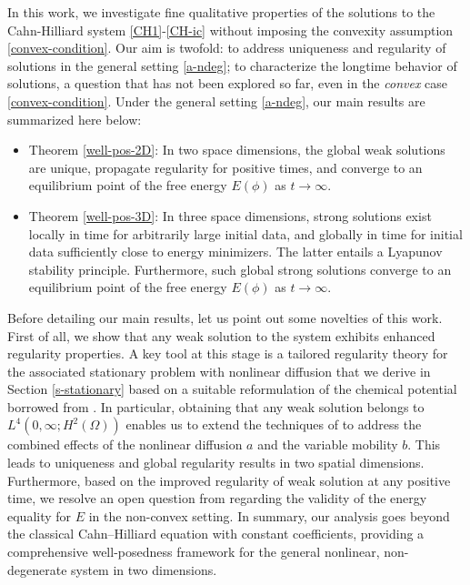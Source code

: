 \documentclass[11pt,reqno]{amsart}
\theoremstyle{remark}
\numberwithin{equation}{section}
\begin{document}
In this work, we investigate fine qualitative properties of the solutions to the Cahn-Hilliard system \eqref{CH1}-\eqref{CH-ic} without imposing the convexity assumption \eqref{convex-condition}. Our aim is twofold: to address uniqueness and regularity of solutions in the general setting  \eqref{a-ndeg}; to characterize the longtime behavior of solutions, a question that has not been explored so far, even in the \textit{convex} case \eqref{convex-condition}.
Under the general setting \eqref{a-ndeg}, our main results are summarized here below:
\begin{itemize}
\item Theorem \ref{well-pos-2D}:
In two space dimensions, the global weak solutions are unique, propagate regularity for positive times, and converge to an equilibrium point of the free energy $E(\phi)$ as $t\to \infty$.
\medskip

\item Theorem \ref{well-pos-3D}: In three space dimensions, strong solutions exist locally in time for arbitrarily large initial data, and globally in time for initial data sufficiently close to energy minimizers. The latter entails a Lyapunov stability principle. Furthermore, such global strong solutions converge to an equilibrium point of the free energy $E(\phi)$ as $t\to \infty$.
\end{itemize}

Before detailing our main results, let us point out some novelties of this work.
First of all, we show that any weak solution to the system exhibits enhanced regularity properties.
A key tool at this stage is a tailored regularity theory
for the associated stationary problem with nonlinear diffusion that we derive in Section \ref{s-stationary} based on a suitable reformulation of the
chemical potential borrowed from \cite{ADG2013}.
In particular, obtaining that any weak solution belongs to $L^4(0,\infty; H^2(\Omega))$ enables us to extend the techniques of \cite{CGGG2025}
to address the combined effects of the nonlinear diffusion $a$ and the variable mobility $b$.
This leads to uniqueness and global regularity results in two spatial dimensions.
Furthermore, based on the improved regularity of weak solution at any positive time, we resolve an open question from \cite[Remark 6.4]{SP2013} regarding the validity of the energy equality for $E$ in the non-convex setting. In summary, our analysis goes beyond the classical Cahn–Hilliard equation with constant coefficients,
providing a comprehensive well-posedness framework for the general nonlinear, non-degenerate system in two dimensions.
\end{document}
